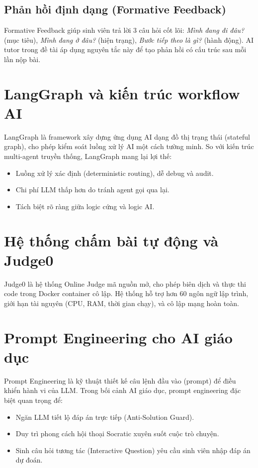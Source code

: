 \subsection{Phản hồi định dạng (Formative Feedback)}

Formative Feedback giúp sinh viên trả lời 3 câu hỏi cốt lõi: \textit{Mình đang đi đâu?} (mục tiêu), \textit{Mình đang ở đâu?} (hiện trạng), \textit{Bước tiếp theo là gì?} (hành động). AI tutor trong đề tài áp dụng nguyên tắc này để tạo phản hồi có cấu trúc sau mỗi lần nộp bài.

\section{LangGraph và kiến trúc workflow AI}

LangGraph là framework xây dựng ứng dụng AI dạng đồ thị trạng thái (stateful graph), cho phép kiểm soát luồng xử lý AI một cách tường minh. So với kiến trúc multi-agent truyền thống, LangGraph mang lại lợi thế:

\begin{itemize}
    \item Luồng xử lý xác định (deterministic routing), dễ debug và audit.
    \item Chi phí LLM thấp hơn do tránh agent gọi qua lại.
    \item Tách biệt rõ ràng giữa logic cứng và logic AI.
\end{itemize}

\section{Hệ thống chấm bài tự động và Judge0}

Judge0 là hệ thống Online Judge mã nguồn mở, cho phép biên dịch và thực thi code trong Docker container cô lập. Hệ thống hỗ trợ hơn 60 ngôn ngữ lập trình, giới hạn tài nguyên (CPU, RAM, thời gian chạy), và cô lập mạng hoàn toàn.

\section{Prompt Engineering cho AI giáo dục}

Prompt Engineering là kỹ thuật thiết kế câu lệnh đầu vào (prompt) để điều khiển hành vi của LLM. Trong bối cảnh AI giáo dục, prompt engineering đặc biệt quan trọng để:

\begin{itemize}
    \item Ngăn LLM tiết lộ đáp án trực tiếp (Anti-Solution Guard).
    \item Duy trì phong cách hội thoại Socratic xuyên suốt cuộc trò chuyện.
    \item Sinh câu hỏi tương tác (Interactive Question) yêu cầu sinh viên nhập đáp án dự đoán.
\end{itemize}

